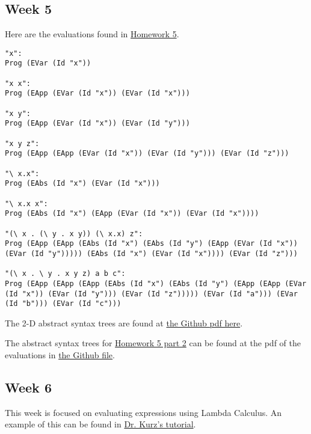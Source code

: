 \documentclass{article}
\theoremstyle{theorem}
\theoremstyle{definition}
\theoremstyle{remark}
\begin{document}
\subsection{Week 5}
Here are the evaluations found in \href{https://hackmd.io/@alexhkurz/S1D0yP8Bw}{Homework 5}.
\begin{lstlisting}
"x":
Prog (EVar (Id "x"))

"x x":
Prog (EApp (EVar (Id "x")) (EVar (Id "x")))

"x y":
Prog (EApp (EVar (Id "x")) (EVar (Id "y")))

"x y z":
Prog (EApp (EApp (EVar (Id "x")) (EVar (Id "y"))) (EVar (Id "z")))

"\ x.x":
Prog (EAbs (Id "x") (EVar (Id "x")))

"\ x.x x":
Prog (EAbs (Id "x") (EApp (EVar (Id "x")) (EVar (Id "x"))))

"(\ x . (\ y . x y)) (\ x.x) z":
Prog (EApp (EApp (EAbs (Id "x") (EAbs (Id "y") (EApp (EVar (Id "x")) (EVar (Id "y"))))) (EAbs (Id "x") (EVar (Id "x")))) (EVar (Id "z")))

"(\ x . \ y . x y z) a b c":
Prog (EApp (EApp (EApp (EAbs (Id "x") (EAbs (Id "y") (EApp (EApp (EVar (Id "x")) (EVar (Id "y"))) (EVar (Id "z"))))) (EVar (Id "a"))) (EVar (Id "b"))) (EVar (Id "c")))
\end{lstlisting}

\noindent The 2-D abstract syntax trees are found at \href{https://github.com/dapak2002/Pak-D-CPSC-354-Report/blob/main/src/HW5.pdf}{the Github pdf here}.

\noindent The abstract syntax trees for \href{https://hackmd.io/@alexhkurz/H1e4Nv8Bv}{Homework 5 part 2} can be found at the pdf of the evaluations in \href{https://github.com/dapak2002/Pak-D-CPSC-354-Report/blob/main/src/Hw5-pt2.pdf}{the Github file}.

\subsection{Week 6}
This week is focused on evaluating expressions using Lambda Calculus. An example of this can be found in \href{https://youtu.be/for3Meg1Lbc}{Dr. Kurz's tutorial}. 
\end{document}
